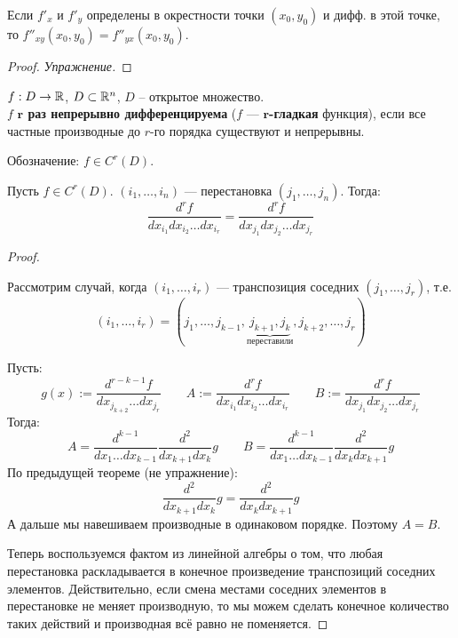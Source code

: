 \begin{theorem}
    Если $f'_x$ и $f'_y$ определены в окрестности точки $(x_0, y_0)$
    и дифф. в этой точке, то $f''_{xy}(x_0, y_0) = f''_{yx}(x_0, y_0)$.
\end{theorem}
\begin{proof}
    \textit{Упражнение.}
\end{proof}

\begin{conj}
    $f : D \to \mathbb{R}$, $D \subset \mathbb{R}^n$, $D$ -- открытое множество. \\
    $f$ \textbf{$\mathbf{r}$ раз непрерывно дифференцируема} 
    ($f$ --- \textbf{$\mathbf{r}$-гладкая} функция), если 
    все частные производные до $r$-го порядка существуют и
    непрерывны.

    Обозначение: $f \in C^r(D)$.
\end{conj}

\begin{theorem}
    Пусть $f \in C^r(D)$. $(i_1, \dots, i_n)$ --- перестановка 
    $(j_1, \dots, j_n)$. Тогда:
    $$ \frac{d^r f}{d x_{i_1} d x_{i_2} \dots d x_{i_r}} = 
    \frac{d^r f}{d x_{j_1} d x_{j_2} \dots d x_{j_r}} $$
\end{theorem}
\begin{proof} $ $

    Рассмотрим случай, когда $(i_1, \dots, i_r)$ --- транспозиция
    соседних $(j_1, \dots, j_r)$, т.е. 
    $$(i_1, \dots, i_r) = (j_1, \dots, j_{k - 1}, 
    \underbrace{j_{k + 1}, j_k}_{\text{переставили}}, 
    j_{k + 2}, \dots, j_r)$$

    Пусть:
    $$ g(x) := \frac{d^{r - k - 1} f}{d x_{j_{k + 2}} \dots d x_{j_r}}
    \quad \quad
    A := \frac{d^r f}{d x_{i_1} d x_{i_2} \dots d x_{i_r}} \quad
    \quad B := \frac{d^r f}{d x_{j_1} d x_{j_2} \dots d x_{j_r}} $$
    Тогда:
    $$ A = \frac{d^{k-1}}{d x_1 \dots d x_{k-1}} 
    \frac{d^{2}}{d x_{k+1} d x_{k}} g \quad \quad 
    B = \frac{d^{k-1}}{d x_1 \dots d x_{k-1}} 
    \frac{d^{2}}{d x_{k} d x_{k+1}} g$$
    По предыдущей теореме (не упражнение):
    $$ \frac{d^{2}}{d x_{k+1} d x_{k}} g = 
    \frac{d^{2}}{d x_{k} d x_{k+1}} g $$
    А дальше мы навешиваем производные в одинаковом порядке.
    Поэтому $A = B$.

    Теперь воспользуемся фактом из линейной алгебры о том, что любая
    перестановка раскладывается в конечное произведение транспозиций
    соседних элементов. Действительно, если смена местами соседних
    элементов в перестановке не меняет производную, 
    то мы можем сделать конечное
    количество таких действий и производная всё равно не поменяется.
\end{proof}

